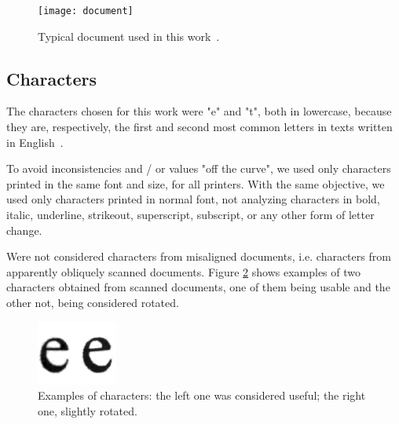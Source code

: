 \documentclass[10pt,twocolumn,letterpaper]{article}
\begin{document}
\begin{figure}
\begin{center}
	\texttt{[image: document]}
	\caption{Typical document used in this work~\cite{Wikipedia}.}
\label{fig:document}   
\end{center} 
\end{figure}

\subsection{Characters}
\label{subsec:characters}

The characters chosen for this work were "e" and "t", both in lowercase, because they are, respectively, the first and second most common letters in texts written in English~\cite{Letter_Frequency}.

To avoid inconsistencies and / or values "off the curve", we used only characters printed in the same font and size, for all printers. With the same objective, we used only characters printed in normal font, not analyzing characters in bold, italic, underline, strikeout, superscript, subscript, or any other form of letter change.

Were not considered characters from misaligned documents, i.e. characters from apparently obliquely scanned documents. Figure \ref{fig:characters} shows examples of two characters obtained from scanned documents, one of them being usable and the other not, being considered rotated.

\begin{figure}
\begin{center}
	\includegraphics[width=0.99\columnwidth]{characters}
	\caption{Examples of characters: the left one was considered useful; the right one, slightly rotated.}
\label{fig:characters}   
\end{center} 
\end{figure}
\end{document}
